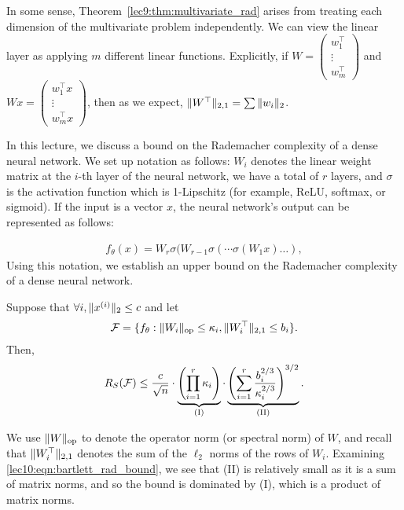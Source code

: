 \begin{remark}
    In some sense, Theorem~\ref{lec9:thm:multivariate_rad} arises from treating each dimension of the multivariate problem independently. We can view the linear layer as applying $m$ different linear functions. Explicitly, if $W = \begin{pmatrix} w_1^\top \\ \vdots \\ w_m^\top \end{pmatrix}$ and $Wx = \begin{pmatrix} w_1^\top x \\ \vdots \\ w_m^\top x \end{pmatrix}$, then as we expect, $\|W^\top\|_{2,1} = \sum \|w_i\|_2$.
\end{remark}


In this lecture, we discuss a bound on the Rademacher complexity of a dense neural network. We set up notation as follows: $W_i$ denotes the linear weight matrix at the $i$-th layer of the neural network, we have a total of $r$ layers, and $\sigma$ is the activation function which is 1-Lipschitz (for example, ReLU, softmax, or sigmoid). If the input is a vector $x$, the neural network's output can be represented as follows:

\begin{align}
    f_\theta(x) = W_r\sigma(W_{r-1}\sigma(\cdots \sigma(W_1x)\ldots),
\end{align}
Using this notation, we establish an upper bound on the Rademacher complexity of a dense neural network.

\begin{theorem}
\label{lec10:thm:dnn_rademacher}
Suppose that $\forall i, \|x^{(i)}\|_2 \leq c$ and let
\begin{align}
    \mathcal F = \{f_\theta : \|W_i\|_{\textup{op}} \leq \kappa_i, \|W_i^\top\|_{2,1} \leq b_i\}.
\end{align}
Then,
\begin{equation}
    R_S (\mathcal F) \leq \frac{c}{\sqrt{n}} \cdot \underbrace{\left(\prod_{i=1}^r \kappa_i \right)}_{\textup{(I)}} \cdot \underbrace{\left( \sum_{i=1}^r\frac{b_i^{2/3}}{\kappa_i^{2/3}}\right)^{3/2}}_{\textup{(II)}}. \label{lec10:eqn:bartlett_rad_bound}
\end{equation}
\end{theorem}
We use $\|W\|_{\textup{op}}$ to denote the operator norm (or spectral norm) of $W$, and recall that $\|W_i^\top\|_{2,1}$ denotes the sum of the $\ell_2$ norms of the rows of $W_i$. Examining \eqref{lec10:eqn:bartlett_rad_bound}, we see that (II) is relatively small as it is a sum of matrix norms, and so the bound is dominated by (I), which is a product of matrix norms.

